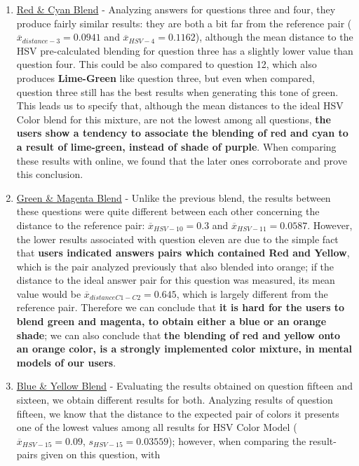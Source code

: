 \begin{enumerate}
  \setlength\itemsep{0.01em}
  \item \ul{Red \& Cyan Blend} - Analyzing answers for questions three and four, they produce fairly similar results: they are both a bit far from the reference pair ($\overline{x}_{distance-3} = 0.0941$ and
  $\overline{x}_{HSV-4} = 0.1162$), although the mean distance to the HSV pre-calculated blending for question three has a slightly lower value than question four. This could be also compared to question 12, which also
  produces \textbf{Lime-Green} like question three, but even when compared, question three still has the best results when generating this tone of green. This leads us to specify that, although the mean distances to the
  ideal HSV Color blend for this mixture, are not the lowest among all questions, \textbf{the users show a tendency to associate the blending of red and cyan to a result of lime-green, instead of shade of purple}. When comparing
  these results with online, we found that the later ones corroborate and prove this conclusion.
  \item \ul{Green \& Magenta Blend} - Unlike the previous blend, the results between these questions were quite different between each other concerning the distance to the reference pair: $\overline{x}_{HSV-10} = 0.3$
  and $\overline{x}_{HSV-11} = 0.0587$. However, the lower results associated with question eleven are due to the simple fact that \textbf{users indicated answers pairs which contained Red and Yellow}, which is the pair
  analyzed previously that also blended into orange; if the distance to the ideal answer pair for this question was measured, its mean value would be $\overline{x}_{distanceC1-C2} = 0.645$, which is largely different from the
  reference pair. Therefore we can conclude that \textbf{it is hard for the users to blend green and magenta, to obtain either a blue or an orange shade}; we can also conclude that \textbf{the blending of red and yellow
  onto an orange color, is a strongly implemented color mixture, in mental models of our users}.
  \item \ul{Blue \& Yellow Blend} - Evaluating the results obtained on question fifteen and sixteen, we obtain different results for both. Analyzing results of question fifteen, we know that the distance to the expected
  pair of colors it presents one of the lowest values among all results for HSV Color Model ($\overline{x}_{HSV-15} = 0.09$, $s_{HSV-15} = 0.03559$); however, when comparing the result-pairs given on this question, with

\end{enumerate}
